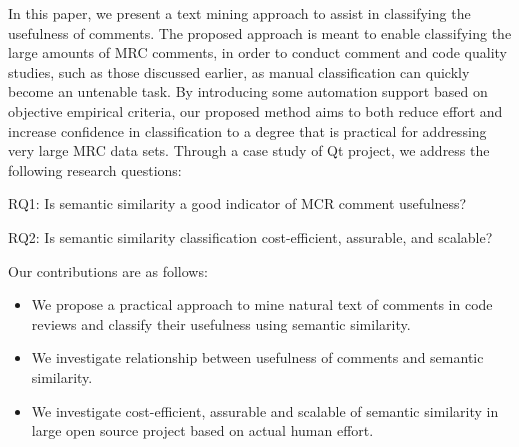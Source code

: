 



In this paper, we present a text mining approach to assist in classifying the usefulness of comments.
The proposed approach is meant to enable classifying the large amounts of MRC comments, in order to conduct comment and code quality studies, such as those discussed earlier, as manual classification can quickly become an untenable task.
By introducing some automation support based on objective empirical criteria,
our proposed method aims to both reduce effort and increase confidence in classification to a degree that is practical for addressing very large MRC data sets.
Through a case study of Qt project, we address the following research questions:
\begin{ResearchQuestions}
\item[RQ1:] Is semantic similarity a good indicator of MCR comment usefulness?\\
\item[RQ2:] Is semantic similarity classification cost-efficient, assurable, and scalable?
\end{ResearchQuestions}

Our contributions are as follows:
\begin{itemize}
\item We propose a practical approach to mine natural text of comments in code reviews and classify their usefulness using semantic similarity.
\item We investigate relationship between usefulness of comments and semantic similarity.
\item We investigate cost-efficient, assurable and scalable of semantic similarity in large open source project based on actual human effort.
\end{itemize}

